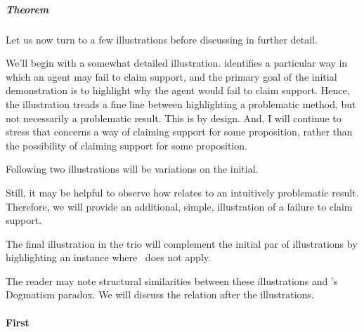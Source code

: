 \subparagraph{Theorem }

\begin{note}
  Let us now turn to a few illustrations before discussing \nI{} in further detail.

  We'll begin with a somewhat detailed illustration.
  \nI{} identifies a particular way in which an agent may fail to claim support, and the primary goal of the initial demonstration is to highlight why the agent would fail to claim support.
  Hence, the illustration treads a fine line between highlighting a problematic method, but not necessarily a problematic result.
  This is by design.
  And, I will continue to stress that \nI{} concerns a way of claiming support for some proposition, rather than the possibility of claiming support for some proposition.

  Following two illustrations will be variations on the initial.

  Still, it may be helpful to observe how \nI{} relates to an intuitively problematic result.
  Therefore, we will provide an additional, simple, illustration of a failure to claim support.

  The final illustration in the trio will complement the initial par of illustrations by highlighting an instance where~\nI{} does not apply.

  The reader may note structural similarities between these illustrations and \citeauthor{Kripke:2011wv}'s Dogmatism paradox.
  We will discuss the relation after the illustrations.
\end{note}

\paragraph{First}

